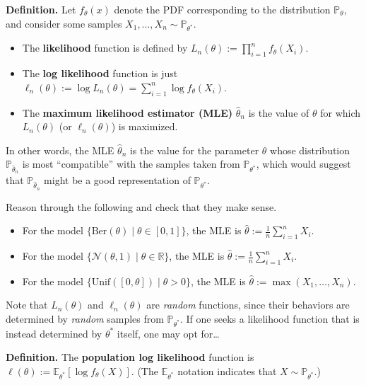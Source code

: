 \textbf{Definition.} Let $f_{\theta}(x)$ denote the PDF corresponding to
the distribution $\mathbb{P}_{\theta}$, and
consider some samples $X_1, \dots, X_n \sim \mathbb{P}_{\theta^*}$.
\begin{itemize}
    \item The \textbf{likelihood} function is defined by
    $L_n(\theta) := \prod_{i = 1}^n f_{\theta}(X_i)$.
    \item The \textbf{log likelihood} function is just $\ell_n(\theta) := \log L_n(\theta)
    = \sum_{i = 1}^n \log f_{\theta}(X_i)$.
    \item The \textbf{maximum likelihood estimator (MLE)} $\hat{\theta}_n$ is the value
    of $\theta$ for which $L_n(\theta)$ (or $\ell_n(\theta)$) is maximized.
\end{itemize}
In other words, the MLE $\hat{\theta}_n$
is the value for the parameter $\theta$ whose distribution $\mathbb{P}_{\hat{\theta}_n}$
is most ``compatible'' with the samples taken from $\mathbb{P}_{\theta^*}$,
which would suggest that $\mathbb{P}_{\hat{\theta}_n}$
might be a good representation of $\mathbb{P}_{\theta^*}$.

\begin{remark}
    Reason through the following and check that they make sense.
    \begin{itemize}
        \item For the model $\{\mathrm{Ber}(\theta) \mid \theta \in [0, 1]\}$,
        the MLE is $\hat{\theta} := \frac{1}{n} \sum_{i = 1}^n X_i$.
        \item For the model $\{\mathcal{N}(\theta, 1) \mid \theta \in \mathbb{R}\}$,
        the MLE is $\hat{\theta} := \frac{1}{n} \sum_{i = 1}^n X_i$.
        \item For the model $\{\mathrm{Unif}([0, \theta]) \mid \theta > 0\}$,
        the MLE is $\hat{\theta} := \max(X_1, \dots, X_n)$.
    \end{itemize}
\end{remark}

Note that $L_n(\theta)$ and $\ell_n(\theta)$ are
\emph{random} functions, since their behaviors are determined by \emph{random} samples
from $\mathbb{P}_{\theta^*}$.
If one seeks a likelihood function that is instead determined by $\theta^*$ itself,
one may opt for\dots

\textbf{Definition.} The \textbf{population log likelihood} function is 
 $\ell(\theta) := \mathbb{E}_{\theta^*}[\log f_{\theta}(X)]$.
(The $\mathbb{E}_{\theta^*}$ notation
indicates that $X \sim \mathbb{P}_{\theta^*}$.)


